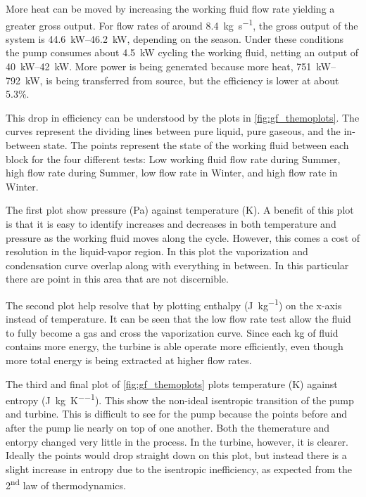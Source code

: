 More heat can be moved by increasing the working fluid flow rate yielding a greater gross output. For flow rates of around \SI{8.4}{\kilogram\per\second}, the gross output of the system is \SIrange{44.6}{46.2}{\kilo\watt}, depending on the season. Under these conditions the pump consumes about \SI{4.5}{\kilo\watt} cycling the working fluid, netting an output of \SIrange{40}{42}{\kilo\watt}. More power is being generated because more heat, \SIrange{751}{792}{\kilo\watt}, is being transferred from source, but the efficiency is lower at about 5.3\%.


This drop in efficiency can be understood by the plots in \autoref{fig:gf_themoplots}. The curves represent the dividing lines between pure liquid, pure gaseous, and the in-between state. The points represent the state of the working fluid between each block for the four different tests: Low working fluid flow rate during Summer, high flow rate during Summer, low flow rate in Winter, and high flow rate in Winter. 

The first plot show pressure (\si{\pascal}) against temperature (\si{\kelvin}). A benefit of this plot is that it is easy to identify increases and decreases in both temperature and pressure as the working fluid moves along the cycle. However, this comes a cost of resolution in the liquid-vapor region. In this plot the vaporization and condensation curve overlap along with everything in between. In this particular there are point in this area that are not discernible. 

The second plot help resolve that by plotting enthalpy (\si[per-mode=symbol-or-fraction]{\joule\per\kilogram}) on the x-axis instead of temperature. It can be seen that the low flow rate test allow the fluid to fully become a gas and cross the vaporization curve. Since each \si{\kilogram} of fluid contains more energy, the turbine is able operate more efficiently, even though more total energy is being extracted at higher flow rates.

The third and final plot of \autoref{fig:gf_themoplots} plots temperature (\si{\kelvin}) against entropy (\si[per-mode=symbol-or-fraction]{\joule\per\kilogram\per\kelvin}). This show the non-ideal isentropic transition of the pump and turbine. This is difficult to see for the pump because the points before and after the pump lie nearly on top of one another. Both the themerature and entorpy changed very little in the process. In the turbine, however, it is clearer. Ideally the points would drop straight down on this plot, but instead there is a slight increase in entropy due to the isentropic inefficiency, as expected from the 2\textsuperscript{nd} law of thermodynamics. 

